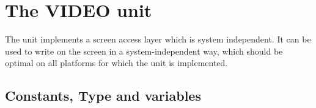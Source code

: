 %
%
%
%
%
%
\chapter{The VIDEO unit}

The  unit implements a screen access layer which is system
independent. It can be used to write on the screen in a system-independent
way, which should be optimal on all platforms for which the unit is
implemented.

\section{Constants, Type and variables }

